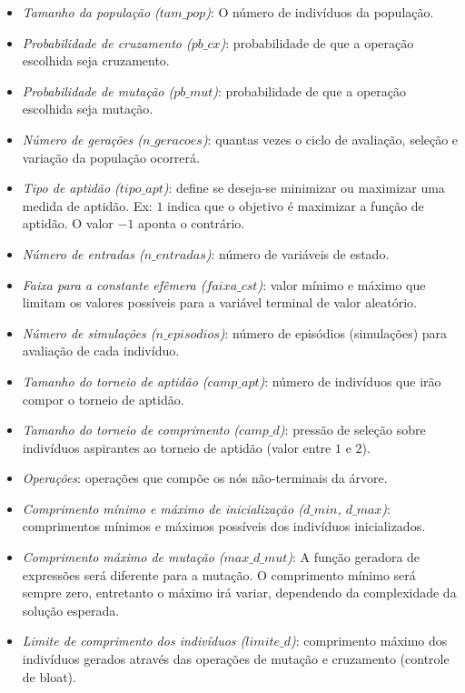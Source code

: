 \begin{itemize}[label=\raisebox{0.25ex}{\tiny$\bullet$}]
	\item \textit{Tamanho da população ($tam\_pop$)}: O número de indivíduos da população.
	\item \textit{Probabilidade de cruzamento ($pb\_cx$)}: probabilidade de que a operação escolhida seja cruzamento.
	\item \textit{Probabilidade de mutação ($pb\_mut$)}: probabilidade de que a operação escolhida seja mutação.
	\item \textit{Número de gerações ($n\_geracoes$)}: quantas vezes o ciclo de avaliação, seleção e variação da população ocorrerá.
	\item \textit{Tipo de aptidão ($tipo\_apt$)}: define se deseja-se minimizar ou maximizar uma medida de aptidão. Ex: $1$ indica que o objetivo é maximizar a função de aptidão. O valor $-1$ aponta o contrário.
	\item \textit{Número de entradas ($n\_entradas$)}: número de variáveis de estado.
	\item \textit{Faixa para a constante efêmera ($faixa\_cst$)}: valor mínimo e máximo que limitam os valores possíveis para a variável terminal de valor aleatório.
	\item \textit{Número de simulações ($n\_episodios$)}: número de episódios (simulações) para avaliação de cada indivíduo.
	\item \textit{Tamanho do torneio de aptidão ($camp\_apt$)}: número de indivíduos que irão compor o torneio de aptidão.
	\item \textit{Tamanho do torneio de comprimento ($camp\_d$)}: pressão de seleção sobre indivíduos aspirantes ao torneio de aptidão (valor entre $1$ e $2$).
	\item \textit{Operações}: operações que compõe os nós não-terminais da árvore.
	\item \textit{Comprimento mínimo e máximo de inicialização ($d\_min$, $d\_max$)}: comprimentos mínimos e máximos possíveis dos indivíduos inicializados.
	\item \textit{Comprimento máximo de mutação ($max\_d\_mut$)}: A função geradora de expressões será diferente para a mutação. O comprimento mínimo será sempre zero, entretanto o máximo irá variar, dependendo da complexidade da solução esperada.
	\item \textit{Limite de comprimento dos indivíduos ($limite\_d$)}: comprimento máximo dos indivíduos gerados através das operações de mutação e cruzamento (controle de bloat).
\end{itemize}

